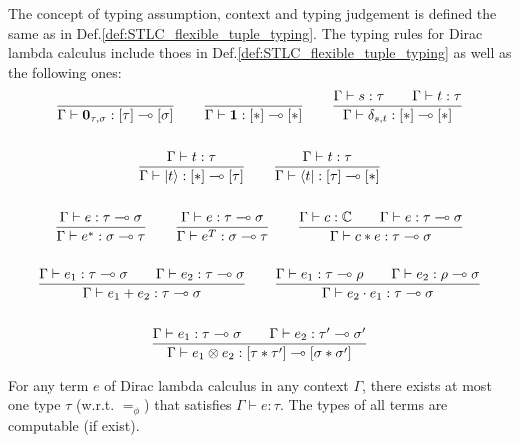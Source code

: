 \begin{definition}
  The concept of typing assumption, context and typing judgement is defined the same as in Def.\ref{def:STLC_flexible_tuple_typing}. The typing rules for Dirac lambda calculus include thoes in Def.\ref{def:STLC_flexible_tuple_typing} as well as the following ones:
  \begin{gather*}
    \frac{}{\Gamma \vdash \mathbf{0}_{\tau, \sigma} : [\tau] \multimap [\sigma]}
    \qquad
    \frac{}{\Gamma \vdash \mathbf{1} : [*] \multimap [*]}
    \qquad
    \frac{\Gamma \vdash s : \tau \qquad \Gamma \vdash t : \tau}{\Gamma \vdash \delta_{s, t} : [*] \multimap [*]}\\
    \ \\
    \frac{\Gamma \vdash t : \tau}{\Gamma \vdash |t\rangle : [*] \multimap [\tau]}
    \qquad 
    \frac{\Gamma \vdash t : \tau}{\Gamma \vdash \langle t| : [\tau] \multimap [*]}\\
    \ \\
    \frac{\Gamma \vdash e : \tau \multimap \sigma}{\Gamma \vdash e^* : \sigma \multimap \tau}
    \qquad
    \frac{\Gamma \vdash e : \tau \multimap \sigma}{\Gamma \vdash e^T : \sigma \multimap \tau}
    \qquad
    \frac{\Gamma \vdash c : \mathbb{C}\qquad \Gamma \vdash e : \tau \multimap \sigma}{\Gamma \vdash c * e : \tau \multimap \sigma}\\
    \ \\
    \frac{\Gamma \vdash e_1 : \tau \multimap \sigma \qquad \Gamma \vdash e_2 : \tau \multimap \sigma }{\Gamma \vdash e_1 + e_2 : \tau \multimap \sigma }
    \qquad 
    \frac{\Gamma \vdash e_1 : \tau \multimap \rho\qquad \Gamma \vdash e_2 : \rho \multimap \sigma}{\Gamma \vdash e_2 \cdot e_1 : \tau \multimap \sigma}\\
    \ \\
    \frac{\Gamma \vdash e_1 : \tau \multimap \sigma \qquad \Gamma \vdash e_2 : \tau' \multimap \sigma'}{\Gamma \vdash e_1 \otimes e_2 : [\tau * \tau'] \multimap [\sigma * \sigma']}
  \end{gather*}
  
\end{definition}

\begin{claim}
  For any term $e$ of Dirac lambda calculus in any context $\Gamma$, there exists at most one type $\tau$ (w.r.t. $=_\phi$) that satisfies $\Gamma \vdash e : \tau$. The types of all terms are computable (if exist).
\end{claim}


